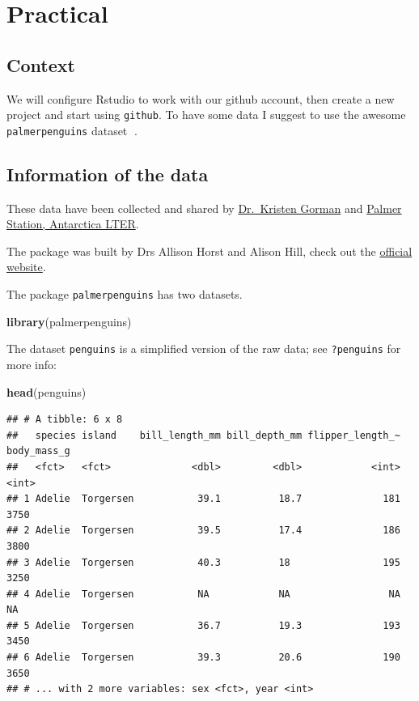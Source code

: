 \documentclass[
  12pt,
]{book}
\newenvironment{Shaded}{\begin{snugshade}}{\end{snugshade}}
\newcommand{\KeywordTok}[1]{\textcolor[rgb]{0.13,0.29,0.53}{\textbf{#1}}}
\newcommand{\NormalTok}[1]{#1}
\begin{document}
\hypertarget{practical-1}{%
\section{Practical}\label{practical-1}}

\hypertarget{context-1}{%
\subsection{Context}\label{context-1}}

We will configure Rstudio to work with our github account, then create a new project and start using \texttt{github}. To have some data I suggest to use the awesome \texttt{palmerpenguins} dataset 🐧.

\hypertarget{information-of-the-data}{%
\subsection{Information of the data}\label{information-of-the-data}}

These data have been collected and shared by \href{https://www.uaf.edu/cfos/people/faculty/detail/kristen-gorman.php}{Dr.~Kristen Gorman} and \href{https://pal.lternet.edu/}{Palmer Station, Antarctica LTER}.

The package was built by Drs Allison Horst and Alison Hill, check out the \href{https://allisonhorst.github.io/palmerpenguins/}{official website}.

The package \texttt{palmerpenguins} has two datasets.

\begin{Shaded}
\begin{Highlighting}[]
\KeywordTok{library}\NormalTok{(palmerpenguins)}
\end{Highlighting}
\end{Shaded}

The dataset \texttt{penguins} is a simplified version of the raw data; see \texttt{?penguins} for more info:

\begin{Shaded}
\begin{Highlighting}[]
\KeywordTok{head}\NormalTok{(penguins)}
\end{Highlighting}
\end{Shaded}

\begin{verbatim}
## # A tibble: 6 x 8
##   species island    bill_length_mm bill_depth_mm flipper_length_~ body_mass_g
##   <fct>   <fct>              <dbl>         <dbl>            <int>       <int>
## 1 Adelie  Torgersen           39.1          18.7              181        3750
## 2 Adelie  Torgersen           39.5          17.4              186        3800
## 3 Adelie  Torgersen           40.3          18                195        3250
## 4 Adelie  Torgersen           NA            NA                 NA          NA
## 5 Adelie  Torgersen           36.7          19.3              193        3450
## 6 Adelie  Torgersen           39.3          20.6              190        3650
## # ... with 2 more variables: sex <fct>, year <int>
\end{verbatim}
\end{document}
